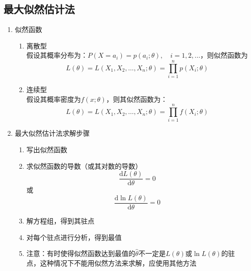 \subsection{最大似然估计法}
\begin{enumerate}
	\item 似然函数
	\begin{enumerate}
		\item 离散型 \\
		假设其概率分布为：$P(X=a_i) = p(a_i;\theta), \quad i=1,2, \dots$，则似然函数为
		\begin{equation}
			L(\theta) = L(X_1, X_2, \dots, X_n; \theta) = \prod_{i=1}^{n}p(X_i;\theta)
		\end{equation}
		\item 连续型 \\
		假设其概率密度为$f(x;\theta)$，则其似然函数为：
		\begin{equation}
			L(\theta) = L(X_1, X_2, \dots, X_n; \theta) = \prod_{i=1}^{n}f(X_i;\theta)
		\end{equation}
	\end{enumerate}
	\item 最大似然估计法求解步骤
	\begin{enumerate}
		\item 写出似然函数
		\item 求似然函数的导数（或其对数的导数）
		\begin{equation}
			\frac{\mathrm{d}L(\theta)}{\mathrm{d}\theta} = 0
		\end{equation}
		或
		\begin{equation}
			\frac{\mathrm{d}\ln L(\theta)}{\mathrm{d}\theta} = 0
		\end{equation}
		\item 解方程组，得到其驻点
		\item 对每个驻点进行分析，得到最值
		\item 注意：有时使得似然函数达到最值的$\hat{\theta}$不一定是$L(\theta)$或$\ln L(\theta)$的驻点，这种情况下不能用似然方法来求解，应使用其他方法
	\end{enumerate}
\end{enumerate}

